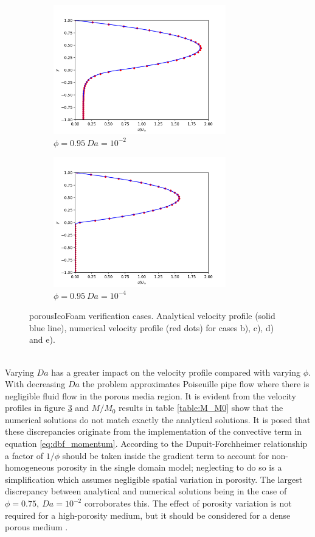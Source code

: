 \documentclass[a4paper,11pt]{report}
\begin{document}
\begin{figure}[ht]
\begin{subfigure}[b]{75mm}
    \end{subfigure}
    \\
    \begin{subfigure}[b]{75mm}
        \includegraphics[width=75mm]{"pty0-95_Da1e-2.png"}
        \caption{$\phi=0.95\ Da=10^{-2}$}
        \label{fig:pty095_Da1e-2}
    \end{subfigure}
    \begin{subfigure}[b]{75mm}
        \includegraphics[width=75mm]{"pty0-95_Da1e-4.png"}
        \caption{$\phi=0.95\ Da=10^{-4}$}
        \label{fig:pty095_Da1e-4}
    \end{subfigure}
    \caption{porousIcoFoam verification cases. Analytical velocity profile (solid blue line), numerical velocity profile (red dots) for cases b), c), d) and e).}\label{fig:porousIcoFoam_verification}
\end{figure}\\
Varying $Da$ has a greater impact on the velocity profile compared with varying $\phi$. With decreasing $Da$ the problem approximates Poiseuille pipe flow where there is negligible fluid flow in the porous media region. It is evident from the velocity profiles in figure \ref{fig:porousIcoFoam_verification} and $M/M_0$ results in table \ref{table:M_M0} show that the numerical solutions do not match exactly the analytical solutions. It is posed that these discrepancies originate from the implementation of the convective term in equation \ref{eq:dbf_momentum}. According to the Dupuit-Forchheimer relationship a factor of $1/\phi$ should be taken inside the gradient term to account for non-homogeneous porosity in the single domain model; neglecting to do so is a simplification which assumes negligible spatial variation in porosity. The largest discrepancy between analytical and numerical solutions being in the case of $\phi=0.75,\ Da=10^{-2}$ corroborates this. The effect of porosity variation is not required for a high-porosity medium, but it should be considered for a dense porous medium \cite{Vafai1995}.
\end{document}
